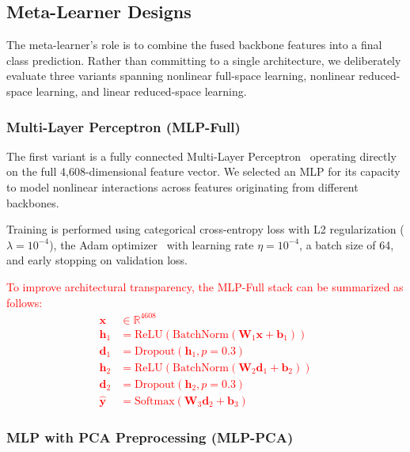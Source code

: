 \documentclass[pdflatex,sn-basic]{sn-jnl}
\begin{document}
\subsection{Meta-Learner Designs}
\label{subsec:metalearners}

The meta-learner's role is to combine the fused backbone features into a final class prediction. Rather than committing to a single architecture, we deliberately evaluate three variants spanning nonlinear full-space learning, nonlinear reduced-space learning, and linear reduced-space learning.

\subsubsection{Multi-Layer Perceptron (MLP-Full)}
\label{subsubsec:mlp_full}

The first variant is a fully connected Multi-Layer Perceptron~\cite{goodfellow2016deep} operating directly on the full 4,608-dimensional feature vector. We selected an MLP for its capacity to model nonlinear interactions across features originating from different backbones.

Training is performed using categorical cross-entropy loss with L2 regularization ($\lambda = 10^{-4}$), the Adam optimizer~\cite{kingma2014adam} with learning rate $\eta = 10^{-4}$, a batch size of 64, and early stopping on validation loss.

\textcolor{red}{To improve architectural transparency, the MLP-Full stack can be summarized as follows:}
\textcolor{red}{
\begin{align*}
\mathbf{x} &\in \mathbb{R}^{4608} \\
\mathbf{h}_1 &= \text{ReLU}(\text{BatchNorm}(\mathbf{W}_1 \mathbf{x} + \mathbf{b}_1)) \\
\mathbf{d}_1 &= \text{Dropout}(\mathbf{h}_1, p=0.3) \\
\mathbf{h}_2 &= \text{ReLU}(\text{BatchNorm}(\mathbf{W}_2 \mathbf{d}_1 + \mathbf{b}_2)) \\
\mathbf{d}_2 &= \text{Dropout}(\mathbf{h}_2, p=0.3) \\
\hat{\mathbf{y}} &= \text{Softmax}(\mathbf{W}_3 \mathbf{d}_2 + \mathbf{b}_3)
\end{align*}
}

\subsubsection{MLP with PCA Preprocessing (MLP-PCA)}
\label{subsubsec:mlp_pca}
\end{document}
